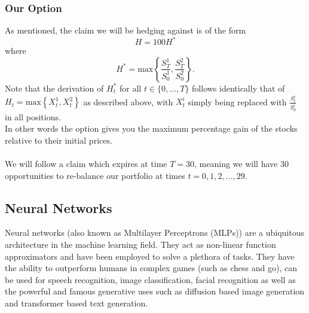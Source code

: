 \documentclass{article}
\theoremstyle{definition}
\begin{document}
\subsubsection{Our Option}
As mentioned, the claim we will be hedging against is of the form $$H = 100H^*$$
where $$H^* = \text{max}\left\{\frac{S^{1}_{T}}{S^{1}_{0}}, \frac{S^{2}_{T}}{S^{2}_{0}}\right\}.$$
Note that the derivation of $H_t^*$ for all $t \in \{0,...,T\}$ follows identically that of $H_{t}= \text{max}\left\{X_{t}^{1}, X_{t}^{2}\right\}$ as described above, with $X_t^i$ simply being replaced with $\frac{S^{i}_{t}}{S^{i}_{0}}$ in all positions.\\
In other words the option gives you the maximum percentage gain of the stocks relative to their initial prices.
\\\\
We will follow a claim which expires at time $T=30$, meaning we will have 30 opportunities to re-balance our portfolio at times $t=0,1,2,...,29.$

\subsection{Neural Networks}

Neural networks (also known as Multilayer Perceptrons (MLPs)) are a ubiquitous architecture in the machine learning field. They act as non-linear function approximators and have been employed to solve a plethora of tasks. They have the ability to outperform humans in complex games (such as chess and go), can be used for speech recognition, image classification, facial recognition as well as the powerful and famous generative uses such as diffusion based image generation and transformer based text generation.
\end{document}
